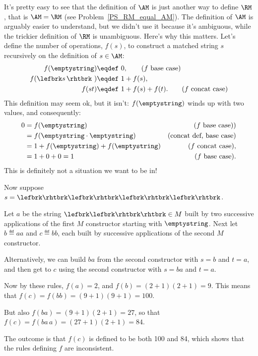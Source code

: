 It's pretty easy to see that the definition of $\AM$ is just another way
to define $\RM$, that is $\AM = \RM$ (see Problem~\ref{PS_RM_equal_AM}).
The definition of $\AM$ is arguably easier to understand, but we didn't
use it because it's ambiguous, while the trickier definition of $\RM$ is
unambiguous.  Here's why this matters.  Let's define the number of
operations, $f(s)$, to construct a matched string $s$ recursively on the
definition of $s \in \AM$:
\begin{align*}
  f(\emptystring)        & \eqdef\ 0, \tag{$f$ base case}\\
  f(\lefbrk s\,\rhtbrk\ ) & \eqdef\ 1+ f(s), \\
  f(st)                  & \eqdef\ 1+ f(s) +f(t).\tag{$f$ concat case}
\end{align*}
This definition may seem ok, but it isn't:
$f(\emptystring)$ winds up with two values, and consequently:
\begin{align*}
0 & = f(\emptystring) & \text{($f$ base case))}\\
  & = f(\emptystring \cdot \emptystring) & \text{(concat def, base case)} \\
                & = 1 + f(\emptystring) + f(\emptystring)
                      &  \text{($f$ concat case)},\\
                & = 1 + 0 + 0 = 1
                      & \text{($f$ base case)}.
\end{align*}
This is definitely not a situation we want to be in!


\iffalse

Now suppose $s = \lefbrk\rhtbrk\lefbrk\rhtbrk\lefbrk\rhtbrk\lefbrk\rhtbrk$.



Let $a$ be the string $\lefbrk\lefbrk\rhtbrk\rhtbrk \in M$ built by two successive
applications of the first $M$ constructor starting with $\emptystring$.  Next
let $b \eqdef aa$ and $c \eqdef bb$, each built by successive applications
of the second $M$ constructor.

Alternatively, we can build $ba$ from the second constructor with $s=b$
and $t=a$, and then get to $c$ using the second constructor with $s=ba$
and $t=a$.

Now by these rules, $f(a) = 2$, and $f(b) = (2+1)(2+1)=9$.  This means
that $f(c) = f(bb)= (9+1)(9+1)=100$.

But also $f(ba) = (9+1)(2+1) = 27$, so that $f(c) = f(ba\,a) = (27 +1)
(2+1) = 84$.

The outcome is that $f(c)$ is defined to be both 100 and 84, which shows
that the rules defining $f$ are inconsistent.

